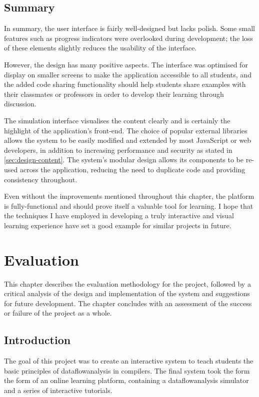 \documentclass[bsc,twoside,singlespacing,parskip,logo,notimes,normalheadings]{infthesis}
\begin{document}
        \section{Summary}
        In summary, the user interface is fairly well-designed but
        lacks polish. Some small features such as progress indicators
        were overlooked during development; the loss of these elements
        slightly reduces the usability of the interface.

        However, the design has many positive aspects. The interface
        was optimised for display on smaller screens to make the
        application accessible to all students, and the added code
        sharing functionality should help students share examples with
        their classmates or professors in order to develop their
        learning through discussion.

        The simulation interface visualises the content clearly and is
        certainly the highlight of the application's front-end. The
        choice of popular external libraries allows the system to be
        easily modified and extended by most JavaScript or web
        developers, in addition to increasing performance and security
        as stated in \ref{sec:design-content}. The system's modular
        design allows its components to be re-used across the
        application, reducing the need to duplicate code and providing
        consistency throughout.

        Even without the improvements mentioned throughout this
        chapter, the platform is fully-functional and should prove
        itself a valuable tool for learning. I hope that the
        techniques I have employed in developing a truly interactive
        and visual learning experience have set a good example for
        similar projects in future.

\chapter{Evaluation}
This chapter describes the evaluation methodology for the project,
followed by a critical analysis of the design and implementation of
the system and suggestions for future development. The chapter
concludes with an assessment of the success or failure of the project
as a whole.

    \section{Introduction}
    The goal of this project was to create an interactive system to
    teach students the basic principles of \gls{dataflowanalysis} in
    compilers. The final system took the form the form of an online
    learning platform, containing a \gls{dataflowanalysis} simulator
    and a series of interactive tutorials.
\end{document}
